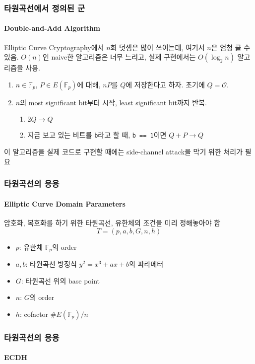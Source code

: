\documentclass[aspectratio=169,mathserif]{beamer}
\newcommand{\Fp}{\mathbb{F}_p}
\begin{document}
  \begin{frame}
    \frametitle{타원곡선에서 정의된 군}
    \framesubtitle{Double-and-Add Algorithm}

    Elliptic Curve Cryptography에서 \(n\)회 덧셈은 많이 쓰이는데, 여기서 \(n\)은 엄청 클 수 있음.
    \pause
    \(O(n)\)인 naive한 알고리즘은 너무 느리고, 실제 구현에서는 \(O(\log_2 n)\) 알고리즘을 사용.
    \begin{enumerate}
      \item \(n\in\Fp,\,P\in E(\Fp)\)에 대해, \(nP\)를 \(Q\)에 저장한다고 하자. 초기에 \(Q = \mathcal{O}\).
      \item \(n\)의 most significant bit부터 시작, least significant bit까지 반복.
      \pause
      \begin{enumerate}
        \item \(2Q\to Q\)
        \item 지금 보고 있는 비트를 \texttt{b}라고 할 때, \texttt{b == 1}이면 \(Q + P\to Q\)
      \end{enumerate}
    \end{enumerate}
    \pause
    이 알고리즘을 실제 코드로 구현할 때에는 side-channel attack을 막기 위한 처리가 필요
  \end{frame}

  \begin{frame}
    \frametitle{타원곡선의 응용}
    \framesubtitle{Elliptic Curve Domain Parameters}

    암호화, 복호화를 하기 위한 타원곡선, 유한체의 조건을 미리 정해놓아야 함
    \[T=(p,a,b,G,n,h)\]
    \begin{itemize}
      \item \(p\): 유한체 \(\Fp\)의 order
      \item \(a, b\): 타원곡선 방정식 \(y^2 = x^3 + ax + b\)의 파라메터
      \item \(G\): 타원곡선 위의 base point
      \item \(n\): \(G\)의 order
      \item \(h\): cofactor \(\#E(\Fp)/n\)
    \end{itemize}
  \end{frame}

  \begin{frame}
    \frametitle{타원곡선의 응용}
    \framesubtitle{ECDH}

    \begin{figure}
      \centering
    \scalebox{0.4}{}
    \end{figure}
  \end{frame}
\end{document}

